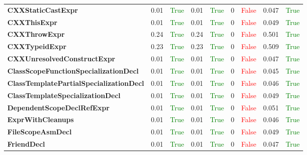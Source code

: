 \documentclass{article}
\begin{document}
\begin{xltabular}{\textwidth}{lcccccccc}
\textbf{{\fontsize{10}{12}\selectfont CXXStaticCastExpr}}& 0.01&\textcolor{green}{True}& 0.01&\textcolor{green}{True}& 0&\textcolor{red}{False}& 0.047&\textcolor{green}{True} \\[0.5ex]
\textbf{{\fontsize{10}{12}\selectfont CXXThisExpr}}& 0.01&\textcolor{green}{True}& 0.01&\textcolor{green}{True}& 0&\textcolor{red}{False}& 0.049&\textcolor{green}{True} \\[0.5ex]
\textbf{{\fontsize{10}{12}\selectfont CXXThrowExpr}}& 0.24&\textcolor{green}{True}& 0.24&\textcolor{green}{True}& 0&\textcolor{red}{False}& 0.501&\textcolor{green}{True} \\[0.5ex]
\textbf{{\fontsize{10}{12}\selectfont CXXTypeidExpr}}& 0.23&\textcolor{green}{True}& 0.23&\textcolor{green}{True}& 0&\textcolor{red}{False}& 0.509&\textcolor{green}{True} \\[0.5ex]
\textbf{{\fontsize{10}{12}\selectfont CXXUnresolvedConstructExpr}}& 0.01&\textcolor{green}{True}& 0.01&\textcolor{green}{True}& 0&\textcolor{red}{False}& 0.047&\textcolor{green}{True} \\[0.5ex]
\textbf{{\fontsize{10}{12}\selectfont ClassScopeFunctionSpecializationDecl}}& 0.01&\textcolor{green}{True}& 0.01&\textcolor{green}{True}& 0&\textcolor{red}{False}& 0.045&\textcolor{green}{True} \\[0.5ex]
\textbf{{\fontsize{10}{12}\selectfont ClassTemplatePartialSpecializationDecl}}& 0.01&\textcolor{green}{True}& 0.01&\textcolor{green}{True}& 0&\textcolor{red}{False}& 0.046&\textcolor{green}{True} \\[0.5ex]
\textbf{{\fontsize{10}{12}\selectfont ClassTemplateSpecializationDecl}}& 0.01&\textcolor{green}{True}& 0.01&\textcolor{green}{True}& 0&\textcolor{red}{False}& 0.049&\textcolor{green}{True} \\[0.5ex]
\textbf{{\fontsize{10}{12}\selectfont DependentScopeDeclRefExpr}}& 0.01&\textcolor{green}{True}& 0.01&\textcolor{green}{True}& 0&\textcolor{red}{False}& 0.051&\textcolor{green}{True} \\[0.5ex]
\textbf{{\fontsize{10}{12}\selectfont ExprWithCleanups}}& 0.01&\textcolor{green}{True}& 0.01&\textcolor{green}{True}& 0&\textcolor{red}{False}& 0.046&\textcolor{green}{True} \\[0.5ex]
\textbf{{\fontsize{10}{12}\selectfont FileScopeAsmDecl}}& 0.01&\textcolor{green}{True}& 0.01&\textcolor{green}{True}& 0&\textcolor{red}{False}& 0.049&\textcolor{green}{True} \\[0.5ex]
\textbf{{\fontsize{10}{12}\selectfont FriendDecl}}& 0.01&\textcolor{green}{True}& 0.01&\textcolor{green}{True}& 0&\textcolor{red}{False}& 0.047&\textcolor{green}{True} \\[0.5ex]

\end{xltabular}
\end{document}
